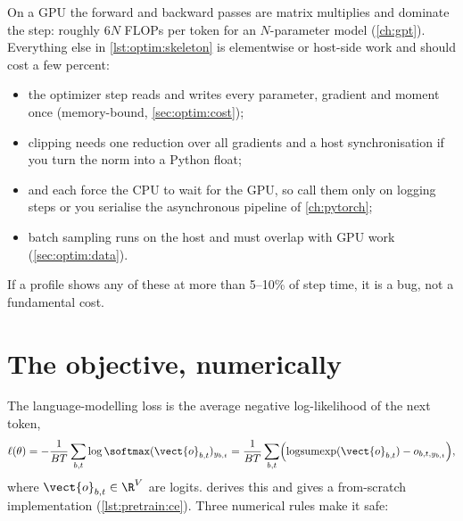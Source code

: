 \begin{systemslens}
On a GPU the forward and backward passes are matrix multiplies and dominate the step: roughly
$6N$ FLOPs per token for an $N$-parameter model (\cref{ch:gpt}). Everything else in
\cref{lst:optim:skeleton} is elementwise or host-side work and should cost a few percent:
\begin{itemize}
  \item the optimizer step reads and writes every parameter, gradient and moment once
        (memory-bound, \cref{sec:optim:cost});
  \item clipping needs one reduction over all gradients and a host synchronisation if you turn
        the norm into a Python float;
  \item {} and  each force the CPU to wait for the GPU, so call
        them only on logging steps or you serialise the asynchronous pipeline of \cref{ch:pytorch};
  \item batch sampling runs on the host and must overlap with GPU work (\cref{sec:optim:data}).
\end{itemize}
If a profile shows any of these at more than 5--10\% of step time, it is a bug, not a
fundamental cost.
\end{systemslens}

\section{The objective, numerically}\label{sec:optim:loss}

The language-modelling loss is the average negative log-likelihood of the next token,
\begin{equation}
\ell(\theta) = -\frac{1}{BT}\sum_{b,t}\log \softmax(\vect{o}_{b,t})_{y_{b,t}}
= \frac{1}{BT}\sum_{b,t}\Bigl(\operatorname{logsumexp}(\vect{o}_{b,t}) - o_{b,t,y_{b,t}}\Bigr),
\label{eq:optim:ce}
\end{equation}
where $\vect{o}_{b,t}\in\R^{V}$ are logits.  derives this and gives a
from-scratch implementation (\cref{lst:pretrain:ce}). Three numerical rules make it safe:

